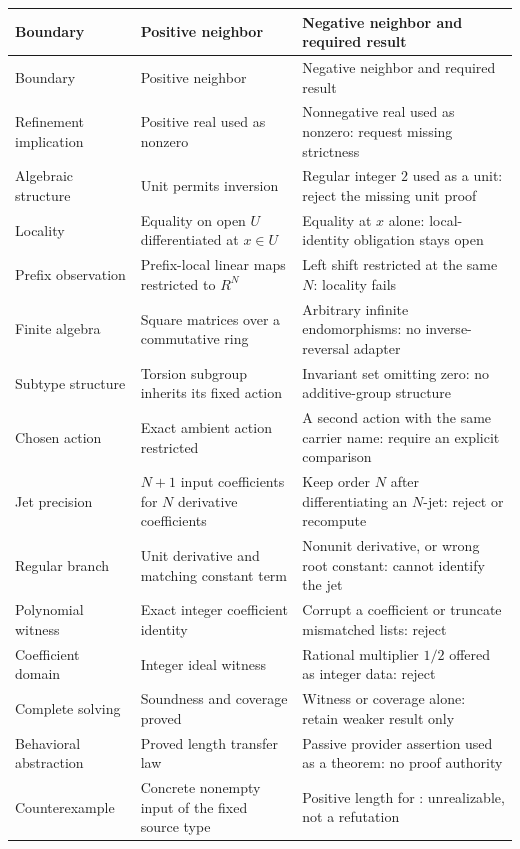 \documentclass[11pt,a4paper]{article}
\newcommand{\code}[1]{\texttt{\detokenize{#1}}}
\theoremstyle{plain}
\theoremstyle{definition}
\begin{document}
\begin{center}\small
\begin{longtable}{@{}L{34mm}L{55mm}L{62mm}@{}}
\toprule
Boundary & Positive neighbor & Negative neighbor and required result\\
\midrule\endfirsthead
\toprule Boundary & Positive neighbor & Negative neighbor and required result\\\midrule\endhead
Refinement implication & Positive real used as nonzero & Nonnegative real used as nonzero: request missing strictness\\
Algebraic structure & Unit permits inversion & Regular integer $2$ used as a unit: reject the missing unit proof\\
Locality & Equality on open $U$ differentiated at $x\in U$ & Equality at $x$ alone: local-identity obligation stays open\\
Prefix observation & Prefix-local linear maps restricted to $R^N$ & Left shift restricted at the same $N$: locality fails\\
Finite algebra & Square matrices over a commutative ring & Arbitrary infinite endomorphisms: no inverse-reversal adapter\\
Subtype structure & Torsion subgroup inherits its fixed action & Invariant set omitting zero: no additive-group structure\\
Chosen action & Exact ambient action restricted & A second action with the same carrier name: require an explicit comparison\\
Jet precision & $N+1$ input coefficients for $N$ derivative coefficients & Keep order $N$ after differentiating an $N$-jet: reject or recompute\\
Regular branch & Unit derivative and matching constant term & Nonunit derivative, or wrong root constant: cannot identify the jet\\
Polynomial witness & Exact integer coefficient identity & Corrupt a coefficient or truncate mismatched lists: reject\\
Coefficient domain & Integer ideal witness & Rational multiplier $1/2$ offered as integer data: reject\\
Complete solving & Soundness and coverage proved & Witness or coverage alone: retain weaker result only\\
Behavioral abstraction & Proved length transfer law & Passive provider assertion used as a theorem: no proof authority\\
Counterexample & Concrete nonempty input of the fixed source type & Positive length for \code{List Empty}: unrealizable, not a refutation\\

\end{longtable}
\end{center}
\end{document}
